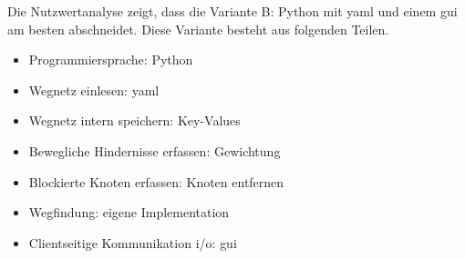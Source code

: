 Die Nutzwertanalyse zeigt, dass die Variante B: Python mit \gls{yaml} und einem \acrshort{gui} am besten abschneidet. Diese Variante besteht aus folgenden Teilen.

\begin{itemize}
    \item Programmiersprache: Python
    \item Wegnetz einlesen: \gls{yaml}
    \item Wegnetz intern speichern: Key-Values
    \item Bewegliche Hindernisse erfassen: Gewichtung
    \item Blockierte Knoten erfassen: Knoten entfernen
    \item Wegfindung: eigene Implementation
    \item Clientseitige Kommunikation \acrshort{i/o}: \acrshort{gui}
\end{itemize}